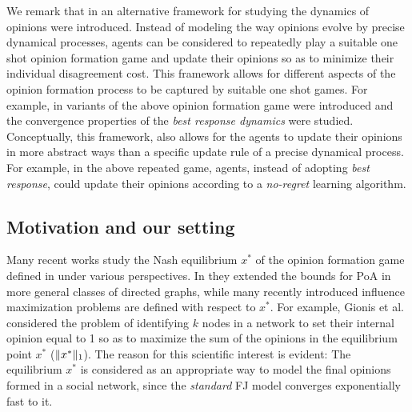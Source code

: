 We remark that in \cite{BKO11} an alternative framework for studying
the dynamics of opinions were introduced. Instead of
modeling the way opinions evolve by precise dynamical processes, agents can be
considered to repeatedly play a suitable one shot opinion formation game and
update their opinions so as to minimize their individual disagreement cost.
This framework allows for different aspects of the opinion formation process to
be captured by suitable one shot games.  For example, in \cite{BGM13,BFM16,EFHS17}
variants of the above opinion formation game were introduced and the
convergence properties of the \emph{best response dynamics} were studied.
Conceptually, this framework, also allows for the agents to update their
opinions in more abstract ways than a specific update rule of a precise
dynamical process.  For example, in the above repeated game, agents, instead of
adopting \emph{best response}, could update their opinions according to a
\emph{no-regret} learning algorithm.

\subsection{Motivation and our setting}

Many recent works study the Nash equilibrium $x^*$
of the opinion formation game defined in \cite{BKO11}
under various perspectives. In \cite{CCL16} they extended the
bounds for PoA in more general classes of directed graphs, 
while many recently introduced influence maximization problems 
\cite{GTT13,AKPT18,MMT17} are defined with respect to $x^*$.
For example, Gionis et al. \cite{GTT13} considered the problem 
of identifying $k$ nodes in a network to set their internal 
opinion equal to 1 so as to maximize the sum
of the opinions in the equilibrium point $x^*$ ($\norm{1}{x^*}$).
The reason for this scientific interest is evident:
The equilibrium $x^*$ is considered as
an appropriate way to model the final opinions 
formed in a social network, since the \emph{standard} 
FJ model converges exponentially fast to it. 

